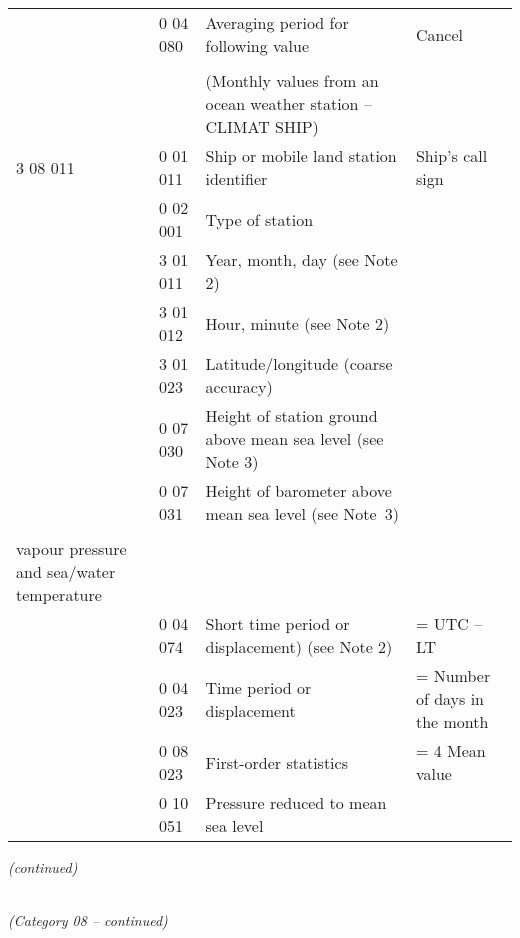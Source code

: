 \begin{longtable}[]{@{}llll@{}}
& 0 04 080 & Averaging period for following value & Cancel\tabularnewline
& & &\tabularnewline
& & (Monthly values from an ocean weather station -- CLIMAT SHIP) &\tabularnewline
3 08 011 & 0 01 011 & Ship or mobile land station identifier & Ship's call sign\tabularnewline
& 0 02 001 & Type of station &\tabularnewline
& 3 01 011 & Year, month, day (see Note 2) &\tabularnewline
& 3 01 012 & Hour, minute (see Note 2) &\tabularnewline
& 3 01 023 & Latitude/longitude (coarse accuracy) &\tabularnewline
& 0 07 030 & Height of station ground above mean sea level (see Note 3) &\tabularnewline
& 0 07 031 & Height of barometer above mean sea level (see Note~3) &\tabularnewline
& & \emph{Monthly mean values of pressure, temperature,\\
vapour pressure and sea/water temperature} &\tabularnewline
& 0 04 074 & Short time period or displacement) (see Note 2) & = UTC -- LT\tabularnewline
& 0 04 023 & Time period or displacement & = Number of days in the month\tabularnewline
& 0 08 023 & First-order statistics & = 4 Mean value\tabularnewline
& 0 10 051 & Pressure reduced to mean sea level &\tabularnewline
\bottomrule
\end{longtable}

\emph{(continued)}

\emph{\\
(Category 08 -- continued)}

